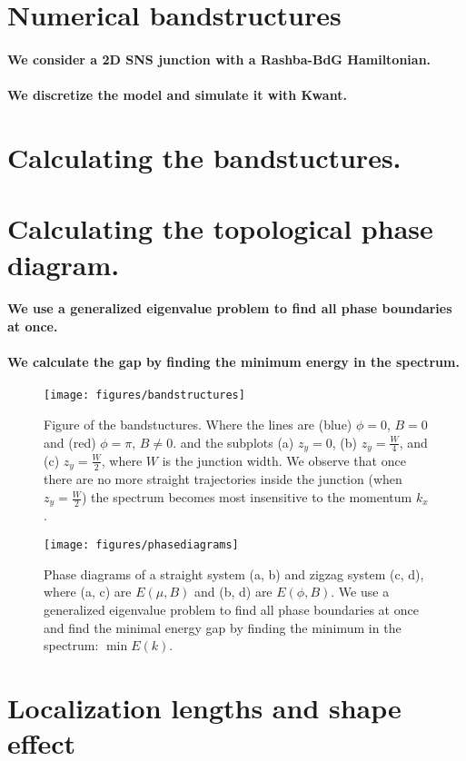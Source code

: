 \documentclass[english, twocolumn, 10pt, aps, superscriptaddress, floatfix, prb, citeautoscript]{revtex4-1}
\renewcommand{\comment}[2]{#2}
\renewcommand{\comment}{\paragraph}
\begin{document}
\section{Numerical bandstructures}

\comment{We consider a 2D SNS junction with a Rashba-BdG Hamiltonian.}

\comment{We discretize the model and simulate it with Kwant.}

\section{Calculating the bandstuctures.}

\section{Calculating the topological phase diagram.}

\comment{We use a generalized eigenvalue problem to find all phase boundaries at once.}

\comment{We calculate the gap by finding the minimum energy in the spectrum.}

\begin{figure}[!htb]
\texttt{[image: figures/bandstructures]}
\caption{Figure of the bandstuctures.
Where the lines are (blue) $\phi=0$, $B=0$ and (red) $\phi=\pi$, $B \ne 0$.
and the subplots (a) $z_y=0$, (b) $z_y=\frac{W}{4}$, and (c) $z_y=\frac{W}{2}$, where $W$ is the junction width.
We observe that once there are no more straight trajectories inside the junction (when $z_y=\frac{W}{2}$) the spectrum becomes most insensitive to the momentum $k_x$.
\label{fig:bandstuctures}}
\end{figure}

\begin{figure}[!htb]
\texttt{[image: figures/phasediagrams]}
\caption{Phase diagrams of a straight system (a, b) and zigzag system (c, d), where (a, c) are $E(\mu, B)$ and (b, d) are $E(\phi, B)$.
We use a generalized eigenvalue problem to find all phase boundaries at once and find the minimal energy gap by finding the minimum in the spectrum: $\min{E(k)}$.
\label{fig:phasediagrams}}
\end{figure}


\section{Localization lengths and shape effect}
\end{document}
